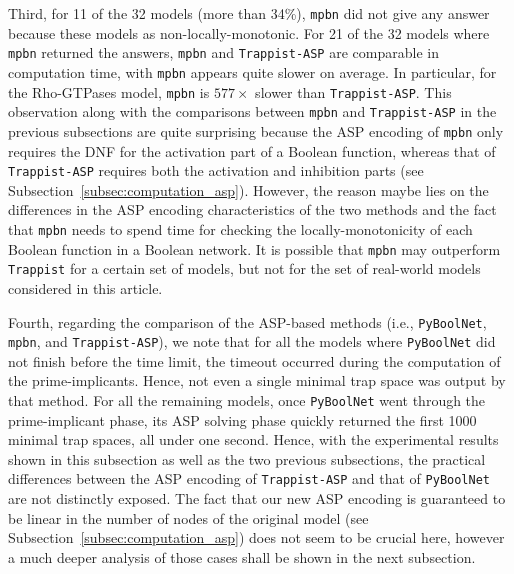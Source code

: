 \documentclass[preprint,12pt]{elsarticle}
\begin{document}
Third, for 11 of the 32 models (more than 34\%), \texttt{mpbn} did not give any answer because these models as non-locally-monotonic.
For 21 of the 32 models where \texttt{mpbn} returned the answers, \texttt{mpbn} and \texttt{Trappist-ASP} are comparable in computation time, with \texttt{mpbn} appears quite slower on average.
In particular, for the Rho-GTPases model, \texttt{mpbn} is \(577\times\) slower than \texttt{Trappist-ASP}.
This observation along with the comparisons between \texttt{mpbn} and \texttt{Trappist-ASP} in the previous subsections are quite surprising because the ASP encoding of \texttt{mpbn} only requires the DNF for the activation part of a Boolean function, whereas that of \texttt{Trappist-ASP} requires both the activation and inhibition parts (see Subsection~\ref{subsec:computation_asp}).
However, the reason maybe lies on the differences in the ASP encoding characteristics of the two methods and the fact that \texttt{mpbn} needs to spend time for checking the locally-monotonicity of each Boolean function in a Boolean network.
It is possible that \texttt{mpbn} may outperform \texttt{Trappist} for a certain set of models, but not for the set of real-world models considered in this article.

Fourth, regarding the comparison of the ASP-based methods (i.e., \texttt{PyBoolNet}, \texttt{mpbn}, and \texttt{Trappist-ASP}), we note that for all the models where \texttt{PyBoolNet} did not finish before the time limit, the timeout occurred during the computation of the prime-implicants.
Hence, not even a single minimal trap space was output by that method.
For all the remaining models, once \texttt{PyBoolNet} went through the prime-implicant phase, its ASP solving phase quickly returned the first 1000 minimal trap spaces, all under one second.
Hence, with the experimental results shown in this subsection as well as the two previous subsections, the practical differences between the ASP encoding of \texttt{Trappist-ASP} and that of \texttt{PyBoolNet} are not distinctly exposed.
The fact that our new ASP encoding is guaranteed to be linear in the number of nodes of the original model (see Subsection~\ref{subsec:computation_asp}) does not seem to be crucial here, however a much deeper analysis of those cases shall be shown in the next subsection.
\end{document}
